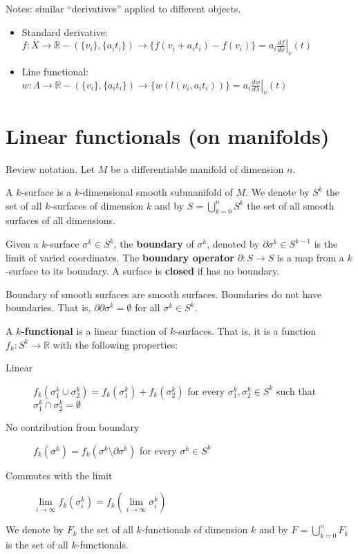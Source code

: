 \documentclass[11pt,letterpaper,fleqn]{memoir}
\begin{document}
Notes: similar ``derivatives'' applied to different objects.
\begin{itemize}
	\item Standard derivative: $f : X \to \mathbb{R} - (\{v_i\}, \{a_i t_i\}) \to \{f(v_i +a_i t_i) - f(v_i)\} = a_i \left. \frac{df}{dx} \right|_{v}(t)$
	\item Line functional: $w : \Lambda \to \mathbb{R} - (\{v_i\}, \{a_i t_i\}) \to \{w(l(v_i, a_i t_i))\} = a_i \left. \frac{dw}{d\lambda} \right|_{v}(t)$
\end{itemize}

\section{Linear functionals (on manifolds)}

Review notation. Let $M$ be a differentiable manifold of dimension $n$.

\begin{defn}
	A $k$-surface is a $k$-dimensional smooth submanifold of $M$. We denote by $S^k$ the set of all  $k$-surfaces of dimension $k$ and by $S = \bigcup_{k=0}^n S^k$ the set of all smooth surfaces of all dimensions.
\end{defn}

\begin{defn}
	Given a $k$-surface $\sigma^k \in S^k$, the \textbf{boundary} of $\sigma^k$, denoted by $\partial\sigma^k \in S^{k-1}$ is the limit of varied coordinates. The \textbf{boundary operator} $\partial : S \to S$ is a map from a $k$-surface to its boundary. A surface is \textbf{closed} if has no boundary.
\end{defn}

\begin{coro}
	Boundary of smooth surfaces are smooth surfaces. Boundaries do not have boundaries. That is, $\partial\partial \sigma^k = \emptyset$ for all $\sigma^k \in S^k$.
\end{coro}


\begin{defn}
	A \textbf{$k$-functional} is a linear function of $k$-surfaces. That is, it is a function $f_k : S^k \to \mathbb{R}$ with the following properties:
	\begin{description}
		\item[Linear] $f_k(\sigma^k_1 \cup \sigma^k_2) = f_k(\sigma^k_1) + f_k(\sigma^k_2)$ for every $\sigma^k_1, \sigma^k_2 \in S^k$ such that $\sigma^k_1 \cap \sigma^k_2 = \emptyset$
		\item[No contribution from boundary] $f_k(\sigma^k) = f_k(\sigma^k \setminus \partial \sigma^k)$ for every $\sigma^k \in S^k$
		\item[Commutes with the limit] $\lim\limits_{i \to \infty} f_k(\sigma_i^k) = f_k(\lim\limits_{i \to \infty}\sigma_i^k)$
	\end{description}
	We denote by $F_k$ the set of all $k$-functionals of dimension $k$ and by $F = \bigcup_{k=0}^nF_k$ is the set of all $k$-functionals.
\end{defn}
\end{document}
